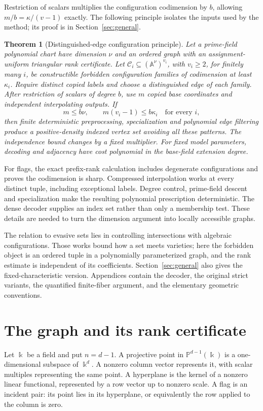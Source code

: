 \documentclass[11pt,a4paper]{article}
\newcommand{\A}{\mathbb A}
\newcommand{\PP}{\mathbb P}
\newcommand{\Ccal}{\mathcal C}
\newtheorem{theorem}{Theorem}[section]
\theoremstyle{definition}
\theoremstyle{remark}
\numberwithin{equation}{section}
\begin{document}
Restriction of scalars multiplies the configuration codimension by $b$, allowing $m/b=\kappa/(v-1)$ exactly. The following principle isolates the inputs used by the method; its proof is in Section~\ref{sec:general}.

\begin{theorem}[Distinguished-edge configuration principle]\label{thm:configuration}
Let a prime-field polynomial chart have dimension $\nu$ and an ordered graph with an assignment-uniform triangular rank certificate. Let $\Ccal_i\subseteq(\A^\nu)^{v_i}$, with $v_i\ge2$, for finitely many $i$, be constructible forbidden configuration families of codimension at least $\kappa_i$. Require distinct copied labels and choose a distinguished edge of each family. After restriction of scalars of degree $b$, use $m$ copied base coordinates and independent interpolating outputs. If
\[
m\le b\nu,\qquad m(v_i-1)\le b\kappa_i\quad\text{for every }i,
\]
then finite deterministic preprocessing, specialization and polynomial edge filtering produce a positive-density indexed vertex set avoiding all these patterns. The independence bound changes by a fixed multiplier. For fixed model parameters, decoding and adjacency have cost polynomial in the base-field extension degree.
\end{theorem}

For flags, the exact prefix-rank calculation includes degenerate configurations and proves the codimension is sharp. Compressed interpolation works at every distinct tuple, including exceptional labels. Degree control, prime-field descent and specialization make the resulting polynomial prescription deterministic. The dense decoder supplies an index set rather than only a membership test. These details are needed to turn the dimension argument into locally accessible graphs.

The relation to evasive sets \cite{DKL,LNZ} lies in controlling intersections with algebraic configurations. Those works bound how a set meets varieties; here the forbidden object is an ordered tuple in a polynomially parameterized graph, and the rank estimate is independent of its coefficients. Section~\ref{sec:general} also gives the fixed-characteristic version. Appendices contain the decoder, the original strict variants, the quantified finite-fiber argument, and the elementary geometric conventions.

\section{The graph and its rank certificate}\label{sec:rank}
Let $\Bbbk$ be a field and put $n=d-1$. A projective point in $\PP^{d-1}(\Bbbk)$ is a one-dimensional subspace of $\Bbbk^d$. A nonzero column vector represents it, with scalar multiples representing the same point. A hyperplane is the kernel of a nonzero linear functional, represented by a row vector up to nonzero scale. A flag is an incident pair: its point lies in its hyperplane, or equivalently the row applied to the column is zero.
\end{document}

